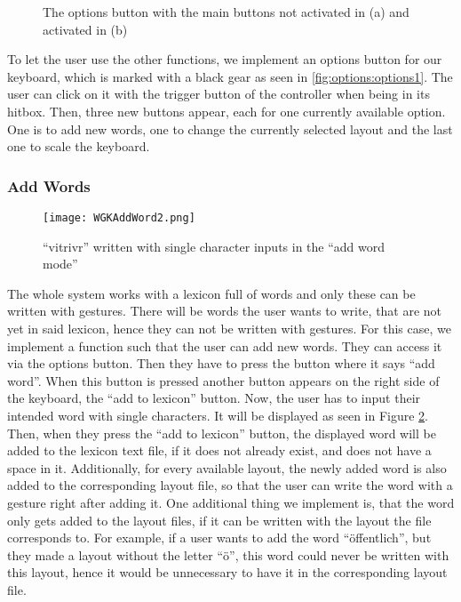 \begin{figure}[H]
    \caption{The options button with the main buttons not activated in (a) and activated in (b)}
    \label{fig:options}
\end{figure}

To let the user use the other functions, we implement an options button for our keyboard, which is marked with a black gear as seen in \cref{fig:options:options1}. The user can click on it with the trigger button of the controller when being in its hitbox. Then, three new buttons appear, each for one currently available option. One is to add new words, one to change the currently selected layout and the last one to scale the keyboard.

\subsubsection{Add Words}
\begin{figure}[H]
    \centering
    \texttt{[image: WGKAddWord2.png]}
    \caption{``vitrivr'' written with single character inputs in the ``add word mode''}
    \label{fig:addword}
\end{figure}
The whole system works with a lexicon full of words and only these can be written with gestures. There will be words the user wants to write, that are not yet in said lexicon, hence they can not be written with gestures. For this case, we implement a function such that the user can add new words. They can access it via the options button. Then they have to press the button where it says ``add word''. When this button is pressed another button appears on the right side of the keyboard, the ``add to lexicon'' button. Now, the user has to input their intended word with single characters. It will be displayed as seen in Figure \ref{fig:addword}. Then, when they press the ``add to lexicon'' button, the displayed word will be added to the lexicon text file, if it does not already exist, and does not have a space in it. Additionally, for every available layout, the newly added word is also added to the corresponding layout file, so that the user can write the word with a gesture right after adding it. One additional thing we implement is, that the word only gets added to the layout files, if it can be written with the layout the file corresponds to. For example, if a user wants to add the word ``öffentlich'', but they made a layout without the letter ``ö'', this word could never be written with this layout, hence it would be unnecessary to have it in the corresponding layout file.

